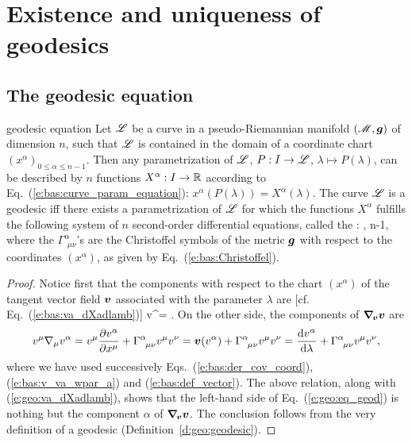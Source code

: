 \section{Existence and uniqueness of geodesics}

\subsection{The geodesic equation} \label{s:geo:geodesic_eq}

\begin{tprop}{geodesic equation}{}
Let $\mathscr{L}$ be a curve in a pseudo-Riemannian
manifold $(\mathscr{M},\bm{g})$ of dimension $n$, such that
$\mathscr{L}$ is contained in the domain of a coordinate chart $(x^\alpha)_{0\leq\alpha\leq n-1}$.
Then any parametrization of $\mathscr{L}$, $P: I \to  \mathscr{L}$, $\lambda\mapsto P(\lambda)$,
can be described by $n$ functions $X^\alpha: I\to \mathbb{R}$
according to Eq.~(\ref{e:bas:curve_param_equation}): $x^\alpha(P(\lambda)) = X^\alpha(\lambda)$.
The curve $\mathscr{L}$ is a geodesic iff there exists a parametrization of $\mathscr{L}$
for which the functions $X^\alpha$ fulfills the following
system of $n$ second-order differential equations, called the
:
\be \label{e:geo:eq_geod}
    ,   \leq \alpha \leq n-1,
\ee
where the $\Gamma^\alpha_{\ \, \mu \nu}$'s are the Christoffel symbols of the metric $\bm{g}$
with respect to the coordinates $(x^\alpha)$, as given by Eq.~(\ref{e:bas:Christoffel}).
\end{tprop}

\begin{proof}
Notice first that the components with respect
to the chart $(x^\alpha)$ of the tangent
vector field $\bm{v}$ associated with the parameter $\lambda$ are [cf. Eq.~(\ref{e:bas:va_dXadlamb})]
\be \label{e:geo:va_dXadlamb}
    v^\alpha =  .
\ee
On the other side, the components of $\bm{\nabla}_{\!\bm{v}}\bm{v}$ are
\[
    v^\mu \nabla_\mu v^\alpha = v^\mu \frac{\partial v^\alpha}{\partial x^\mu} + \Gamma^\alpha_{\ \, \mu \nu} v^\mu v^\nu
    = \bm{v}(v^\alpha) + \Gamma^\alpha_{\ \, \mu \nu} v^\mu v^\nu
    = \frac{\mathrm{d} v^\alpha}{\mathrm{d} \lambda} + \Gamma^\alpha_{\ \, \mu \nu} v^\mu v^\nu ,
\]
where we have used
successively Eqs.~(\ref{e:bas:der_cov_coord}), (\ref{e:bas:v_va_wpar_a}) and
(\ref{e:bas:def_vector}). The above relation, along with (\ref{e:geo:va_dXadlamb}),
shows that the left-hand side of
Eq.~(\ref{e:geo:eq_geod}) is nothing but the component $\alpha$ of
$\bm{\nabla}_{\!\bm{v}}\bm{v}$. The conclusion follows from the very definition
of a geodesic (Definition~\ref{d:geo:geodesic}).
\end{proof}

